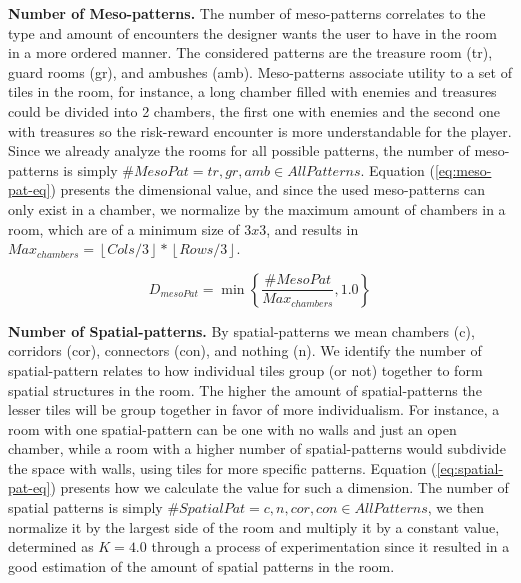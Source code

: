 \documentclass[conference]{IEEEtran}
\begin{document}
\textbf{Number of Meso-patterns.} The number of meso-patterns correlates to the type and amount of encounters the designer wants the user to have in the room in a more ordered manner. The considered patterns are the treasure room (tr), guard rooms (gr), and ambushes (amb). Meso-patterns associate utility to a set of tiles in the room, for instance, a long chamber filled with enemies and treasures could be divided into 2 chambers, the first one with enemies and the second one with treasures so the risk-reward encounter is more understandable for the player. Since we already analyze the rooms for all possible patterns, the number of meso-patterns is simply $\#MesoPat=tr, gr, amb \in AllPatterns$. Equation (\ref{eq:meso-pat-eq}) presents the dimensional value, and since the used meso-patterns can only exist in a chamber, we normalize by the maximum amount of chambers in a room, which are of a minimum size of $3x3$, and results in $Max_{chambers}=\left\lfloor Cols/3 \right\rfloor * \left\lfloor Rows/3 \right\rfloor$.



\begin{equation} \label{eq:meso-pat-eq}
D_{mesoPat} = \min \left\{ \dfrac{\#MesoPat}{Max_{chambers}}, 1.0 \right\}
\end{equation}


\textbf{Number of Spatial-patterns.} By spatial-patterns we mean chambers (c), corridors (cor), connectors (con), and nothing (n). We identify the number of spatial-pattern relates to how individual tiles group (or not) together to form spatial structures in the room. The higher the amount of spatial-patterns the lesser tiles will be group together in favor of more individualism. For instance, a room with one spatial-pattern can be one with no walls and just an open chamber, while a room with a higher number of spatial-patterns would subdivide the space with walls, using tiles for more specific patterns. Equation (\ref{eq:spatial-pat-eq}) presents how we calculate the value for such a dimension. The number of spatial patterns is simply $\#SpatialPat=c, n, cor, con \in AllPatterns$, we then normalize it by the largest side of the room and multiply it by a constant value, determined as $K=4.0$ through a process of experimentation since it resulted in a good estimation of the amount of spatial patterns in the room.
\end{document}
